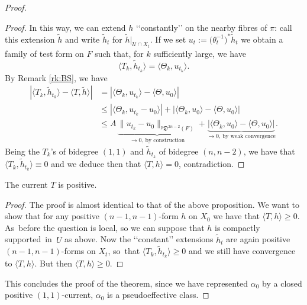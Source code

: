 \begin{appendix}
\begin{proof}
\begin{proof}
In this way, we can extend $h$ \lq\lq constantly\rq\rq{} on the nearby fibres of $\pi$: call this extension $\tilde h$ and write $\tilde h_t$ for $\tilde h|_{\mathcal U\cap X_t}$. If we set $u_t:=\bigl(\theta_t^{-1}\bigr)^*\tilde h_t$ we obtain a family of test form on $F$ such that, for $k$ sufficiently large, we have
\[
\langle T_k,\tilde h_{t_k}\rangle=\langle\Theta_k,u_{t_k}\rangle.
\]
By Remark \ref{rk:BS}, we have
\[
\begin{aligned}
|\langle T_k,\tilde h_{t_k}\rangle-\langle T,\tilde h\rangle| &= |\langle\Theta_k,u_{t_k}\rangle-\langle\Theta,u_{0}\rangle| \\
&\le |\langle\Theta_k,u_{t_k}-u_0\rangle|+|\langle\Theta_k,u_0\rangle-\langle\Theta,u_0\rangle|\\
&\le A\,\underbrace{\|u_{t_k}-u_0\|_{^p\mathfrak D^{2n-2}(F)}}_{\textrm{$\to 0$, by construction}}+\underbrace{|\langle\Theta_k,u_0\rangle-\langle\Theta,u_0\rangle|}_{\textrm{$\to 0$, by weak convergence}}.
\end{aligned}
\]
Being the $T_k$'s of bidegree $(1,1)$ and $\tilde h_{t_k}$ of bidegree $(n,n-2)$, we have that \hbox{$\langle T_k,\tilde h_{t_k}\rangle\equiv 0$} and we deduce then that $\langle T,h\rangle=0$, contradiction.
\end{proof}

\begin{proposition}
The current $T$ is positive.
\end{proposition}

\begin{proof}
The proof is almost identical to that of the above proposition. We want to show that for any positive $(n-1,n-1)$-form $h$ on $X_0$ we have that $\langle T,h\rangle\ge 0$. As~before the question is local, so we can suppose that $h$ is compactly supported~in~$U$ as above. Now the \lq\lq constant\rq\rq{} extensions $\tilde h_t$ are again positive $(n-1,n-1)$-forms on $X_t$, so~that $\langle T_k,\tilde h_{t_k}\rangle\ge 0$ and we still have convergence to $\langle T,h\rangle$. But then $\langle T,h\rangle\ge 0$.
\end{proof}

This concludes the proof of the theorem, since we have represented $\alpha_0$ by a closed positive $(1,1)$-current, \ie $\alpha_0$ is a pseudoeffective class.
\end{proof}

\end{appendix}

\Changelback
